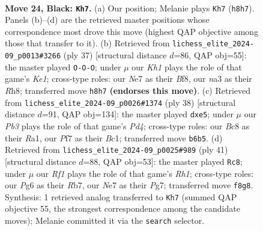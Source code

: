 \documentclass[11pt]{article}
\begin{document}
\clearpage

\begin{figure}[p]\centering
\begin{subfigure}{0.46\textwidth}\centering
\resizebox{\linewidth}{!}{%
\newchessgame
\chessboard[
  setfen={1rb2r1k/p3np2/1p2pnpp/2P5/1RP5/N3PB1P/P2B1PP1/4RK2 b - - 7 24},
  showmover=false,
  pgfstyle=straightmove, color=movearrow, markmove={h8-h7}
]}
\caption{}
\end{subfigure}\hfill
\begin{subfigure}{0.46\textwidth}\centering
\resizebox{\linewidth}{!}{%
\newchessgame
\chessboard[
  setfen={r3kb1r/1p4p1/p1p1np2/4P2p/2N1P2P/1PP2P2/1P1B1P2/R3K2R b KQkq - 0 19},
  showmover=false,
  pgfstyle=straightmove, color=movearrow, markmove={e8-c8}
]}
\caption{}
\end{subfigure}
\\[4pt]
\begin{subfigure}{0.46\textwidth}\centering
\resizebox{\linewidth}{!}{%
\newchessgame
\chessboard[
  setfen={4r3/2p2kb1/1pn3pp/p2rpp2/3P4/2P3P1/PP1N1P1P/R1B1R1K1 w - - 1 20},
  showmover=false,
  pgfstyle=straightmove, color=movearrow, markmove={d4-e5}
]}
\caption{}
\end{subfigure}\hfill
\begin{subfigure}{0.46\textwidth}\centering
\resizebox{\linewidth}{!}{%
\newchessgame
\chessboard[
  setfen={7r/1r1k1pp1/p1n1pn1p/1pBp4/8/P1P2B2/1P3PPP/3RR1K1 b - - 2 21},
  showmover=false,
  pgfstyle=straightmove, color=movearrow, markmove={h8-c8}
]}
\caption{}
\end{subfigure}
\caption{\textbf{Move 24, Black: \texttt{Kh7}.} (a) Our position; Melanie plays \texttt{Kh7} (\texttt{h8h7}). Panels (b)--(d) are the retrieved master positions whose correspondence most drove this move (highest QAP objective among those that transfer to it). (b) Retrieved from \texttt{lichess\_elite\_2024-09\_p0013\#3266} (ply 37) [structural distance $d$=86, QAP obj=55]: the master played \texttt{O-O-O}; under $\mu$ our \emph{Kh1} plays the role of that game's \emph{Ke1}; cross-type roles: our \emph{N}e7 as their \emph{B}f8, our \emph{n}a3 as their \emph{R}h8; transferred move \texttt{h8h7} \textbf{(endorses this move)}. (c) Retrieved from \texttt{lichess\_elite\_2024-09\_p0026\#1374} (ply 38) [structural distance $d$=91, QAP obj=134]: the master played \texttt{dxe5}; under $\mu$ our \emph{Pb3} plays the role of that game's \emph{Pd4}; cross-type roles: our \emph{B}c8 as their \emph{R}a1, our \emph{P}f7 as their \emph{B}c1; transferred move \texttt{b6b5}. (d) Retrieved from \texttt{lichess\_elite\_2024-09\_p0025\#989} (ply 41) [structural distance $d$=88, QAP obj=53]: the master played \texttt{Rc8}; under $\mu$ our \emph{Rf1} plays the role of that game's \emph{Rh1}; cross-type roles: our \emph{P}g6 as their \emph{R}b7, our \emph{N}e7 as their \emph{P}g7; transferred move \texttt{f8g8}. Synthesis: 1 retrieved analog transferred to \texttt{Kh7} (summed QAP objective 55, the strongest correspondence among the candidate moves); Melanie committed it via the \texttt{search} selector.}
\label{fig:thought-m47}
\end{figure}
\end{document}
